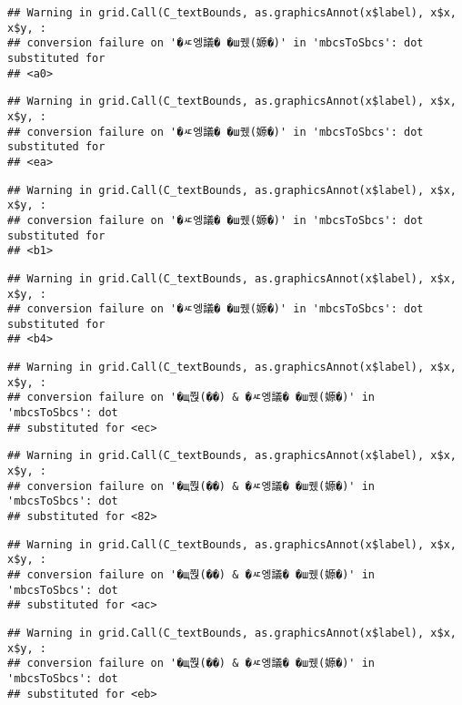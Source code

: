\documentclass[
]{article}
\begin{document}
\begin{verbatim}
## Warning in grid.Call(C_textBounds, as.graphicsAnnot(x$label), x$x, x$y, :
## conversion failure on '�ㅼ엥議� �ш퀬(嫄�)' in 'mbcsToSbcs': dot substituted for
## <a0>
\end{verbatim}

\begin{verbatim}
## Warning in grid.Call(C_textBounds, as.graphicsAnnot(x$label), x$x, x$y, :
## conversion failure on '�ㅼ엥議� �ш퀬(嫄�)' in 'mbcsToSbcs': dot substituted for
## <ea>
\end{verbatim}

\begin{verbatim}
## Warning in grid.Call(C_textBounds, as.graphicsAnnot(x$label), x$x, x$y, :
## conversion failure on '�ㅼ엥議� �ш퀬(嫄�)' in 'mbcsToSbcs': dot substituted for
## <b1>
\end{verbatim}

\begin{verbatim}
## Warning in grid.Call(C_textBounds, as.graphicsAnnot(x$label), x$x, x$y, :
## conversion failure on '�ㅼ엥議� �ш퀬(嫄�)' in 'mbcsToSbcs': dot substituted for
## <b4>
\end{verbatim}

\begin{verbatim}
## Warning in grid.Call(C_textBounds, as.graphicsAnnot(x$label), x$x, x$y, :
## conversion failure on '�щ쭩(��) & �ㅼ엥議� �ш퀬(嫄�)' in 'mbcsToSbcs': dot
## substituted for <ec>
\end{verbatim}

\begin{verbatim}
## Warning in grid.Call(C_textBounds, as.graphicsAnnot(x$label), x$x, x$y, :
## conversion failure on '�щ쭩(��) & �ㅼ엥議� �ш퀬(嫄�)' in 'mbcsToSbcs': dot
## substituted for <82>
\end{verbatim}

\begin{verbatim}
## Warning in grid.Call(C_textBounds, as.graphicsAnnot(x$label), x$x, x$y, :
## conversion failure on '�щ쭩(��) & �ㅼ엥議� �ш퀬(嫄�)' in 'mbcsToSbcs': dot
## substituted for <ac>
\end{verbatim}

\begin{verbatim}
## Warning in grid.Call(C_textBounds, as.graphicsAnnot(x$label), x$x, x$y, :
## conversion failure on '�щ쭩(��) & �ㅼ엥議� �ш퀬(嫄�)' in 'mbcsToSbcs': dot
## substituted for <eb>
\end{verbatim}
\end{document}
